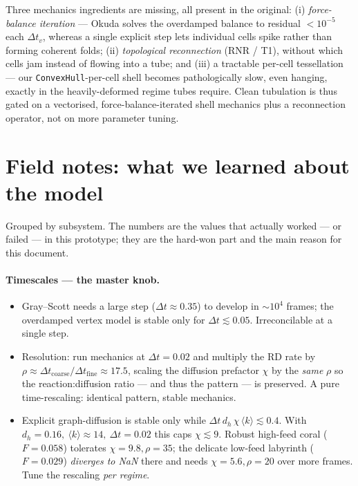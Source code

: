 \documentclass[11pt]{article}
\begin{document}
Three mechanics ingredients are missing, all present in the original: (i) \emph{force-balance
iteration} --- Okuda solves the overdamped balance to residual $<\!10^{-5}$ each $\Delta t_v$,
whereas a single explicit step lets individual cells spike rather than forming coherent folds;
(ii) \emph{topological reconnection} (RNR / T1), without which cells jam instead of flowing into a
tube; and (iii) a tractable per-cell tessellation --- our \texttt{ConvexHull}-per-cell shell becomes
pathologically slow, even hanging, exactly in the heavily-deformed regime tubes require. Clean
tubulation is thus gated on a vectorised, force-balance-iterated shell mechanics plus a reconnection
operator, not on more parameter tuning.

\section{Field notes: what we learned about the model}
Grouped by subsystem. The numbers are the values that actually worked --- or failed --- in this
prototype; they are the hard-won part and the main reason for this document.

\paragraph{Timescales --- the master knob.}
\begin{itemize}\itemsep2pt
\item Gray--Scott needs a large step ($\Delta t\!\approx\!0.35$) to develop in $\sim\!10^4$ frames;
the overdamped vertex model is stable only for $\Delta t\!\lesssim\!0.05$. Irreconcilable at a
single step.
\item Resolution: run mechanics at $\Delta t\!=\!0.02$ and multiply the RD rate by
$\rho\!\approx\!\Delta t_{\text{coarse}}/\Delta t_{\text{fine}}\!\approx\!17.5$, scaling the
diffusion prefactor $\chi$ by the \emph{same} $\rho$ so the reaction:diffusion ratio --- and thus
the pattern --- is preserved. A pure time-rescaling: identical pattern, stable mechanics.
\item Explicit graph-diffusion is stable only while
$\Delta t\,d_h\,\chi\,\langle k\rangle\!\lesssim\!0.4$. With $d_h\!=\!0.16,\ \langle k\rangle\!
\approx\!14,\ \Delta t\!=\!0.02$ this caps $\chi\!\lesssim\!9$. Robust high-feed coral
($F\!=\!0.058$) tolerates $\chi\!=\!9.8,\rho\!=\!35$; the delicate low-feed labyrinth
($F\!=\!0.029$) \emph{diverges to NaN} there and needs $\chi\!=\!5.6,\rho\!=\!20$ over more frames.
Tune the rescaling \emph{per regime}.
\end{itemize}
\end{document}
